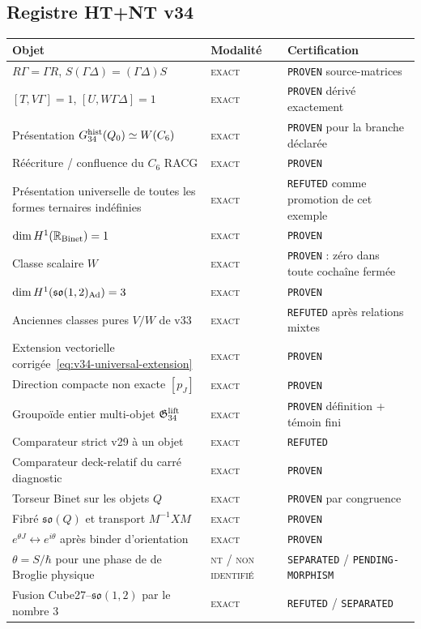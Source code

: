 \documentclass[11pt,a4paper]{article}
\newcommand{\statusExact}{\textsc{exact}}
\newcommand{\statusNT}{\textsc{nt / non identifié}}
\newcommand{\certProven}{\texttt{PROVEN}}
\newcommand{\certRefuted}{\texttt{REFUTED}}
\newcommand{\certSeparated}{\texttt{SEPARATED}}
\newcommand{\certPending}{\texttt{PENDING-MORPHISM}}
\begin{document}
\subsection{Registre HT+NT v34}

\begin{longtable}{p{}p{}p{}}
\toprule
Objet & Modalité & Certification\\
\midrule
\endhead
$R\Gamma=\Gamma R$, $S(\Gamma\Delta)=(\Gamma\Delta)S$ & \statusExact & \certProven{} source-matrices\\
$[T,V\Gamma]=1$, $[U,W\Gamma\Delta]=1$ & \statusExact & \certProven{} dérivé exactement\\
Présentation $G_{34}^{\rm hist}(Q_0)\simeq W(C_6)$ & \statusExact & \certProven{} pour la branche déclarée\\
Réécriture / confluence du $C_6$ RACG & \statusExact & \certProven\\
Présentation universelle de toutes les formes ternaires indéfinies & \statusExact & \certRefuted{} comme promotion de cet exemple\\
$\dim H^1(\mathbb R_{\rm Binet})=1$ & \statusExact & \certProven\\
Classe scalaire $W$ & \statusExact & \certProven{} : zéro dans toute cochaîne fermée\\
$\dim H^1(\mathfrak{so}(1,2)_{\rm Ad})=3$ & \statusExact & \certProven\\
Anciennes classes pures $V/W$ de v33 & \statusExact & \certRefuted{} après relations mixtes\\
Extension vectorielle corrigée~\eqref{eq:v34-universal-extension} & \statusExact & \certProven\\
Direction compacte non exacte $[p_J]$ & \statusExact & \certProven\\
Groupoïde entier multi-objet $\mathfrak G_{34}^{\rm lift}$ & \statusExact & \certProven{} définition + témoin fini\\
Comparateur strict v29 à un objet & \statusExact & \certRefuted\\
Comparateur deck-relatif du carré diagnostic & \statusExact & \certProven\\
Torseur Binet sur les objets $Q$ & \statusExact & \certProven{} par congruence\\
Fibré $\mathfrak{so}(Q)$ et transport $M^{-1}XM$ & \statusExact & \certProven\\
$e^{\theta J}\leftrightarrow e^{i\theta}$ après binder d'orientation & \statusExact & \certProven\\
$\theta=S/\hbar$ pour une phase de de Broglie physique & \statusNT & \certSeparated{} / \certPending\\
Fusion Cube27--$\mathfrak{so}(1,2)$ par le nombre $3$ & \statusExact & \certRefuted{} / \certSeparated\\
\bottomrule
\end{longtable}
\end{document}
